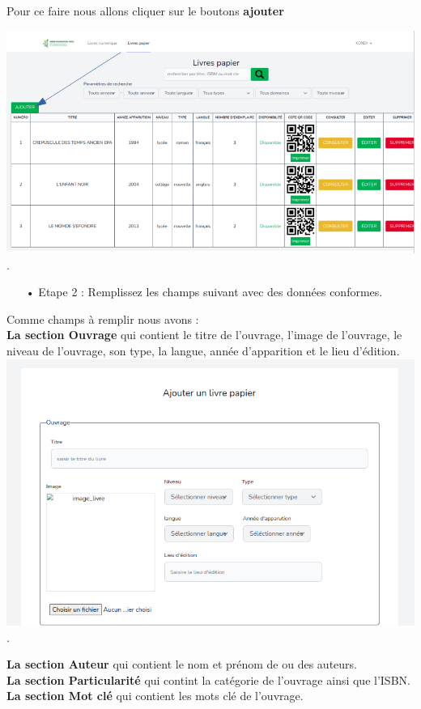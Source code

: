 \documentclass[12pt,a4paper]{article}
\begin{document}
Pour ce faire nous allons cliquer sur le boutons \textbf{ajouter} 

\includegraphics[scale=0.5]{images/SelectOuvragesPhysique2.png}. \\

\begin{itemize}
\item[•]Etape 2 : Remplissez les champs suivant avec des données conformes.
\end{itemize}

Comme champs à remplir nous avons :\\
\textbf{La section Ouvrage} qui contient le titre de l'ouvrage, l'image de l'ouvrage, le niveau de l'ouvrage, son type, la langue, année d'apparition et le lieu d’édition.\\
\includegraphics[scale=0.5]{images/AjoutOuvrage.png}.\\
\newpage

\textbf{La section Auteur} qui contient le nom et prénom de ou des auteurs.\\
\textbf{La section Particularité} qui contint la catégorie de l'ouvrage ainsi que l'ISBN.\\
\textbf{La section Mot clé} qui contient les mots clé de l'ouvrage. \\
\end{document}
